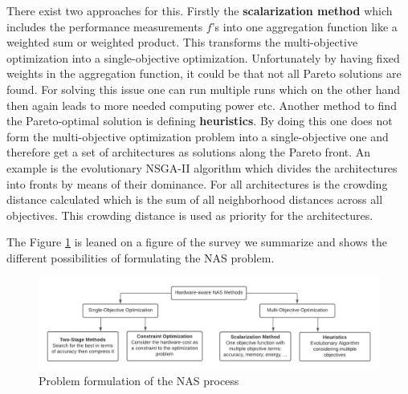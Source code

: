 \documentclass[conference]{IEEEtran}
\begin{document}
There exist two approaches for this. Firstly the \textbf{scalarization method} which includes the performance measurements $f$'s into one aggregation function like a weighted sum or weighted product. This transforms the multi-objective optimization into a single-objective optimization. Unfortunately by having fixed weights in the aggregation function, it could be that not all Pareto solutions are found. For solving this issue one can run multiple runs which on the other hand then again leads to more needed computing power etc. Another method to find the Pareto-optimal solution is defining \textbf{heuristics}. By doing this one does not form the multi-objective optimization problem into a single-objective one and therefore get a set of architectures as solutions along the Pareto front. An example is the evolutionary NSGA-II algorithm \cite{bib14} which divides the architectures into fronts by means of their dominance. For all architectures is the crowding distance calculated which is the sum of all neighborhood distances across all objectives. This crowding distance is used as priority for the architectures.  

The Figure \ref{fig:ProblemFormulation} is leaned on a figure of the survey \cite{bib1} we summarize and shows the different possibilities of formulating the NAS problem.

\begin{figure}[htbp]
\includegraphics[width=\textwidth]{ProblemFormulation.png}
\caption{Problem formulation of the NAS process \cite{bib1}}
\label{fig:ProblemFormulation}
\end{figure} 
\end{document}
